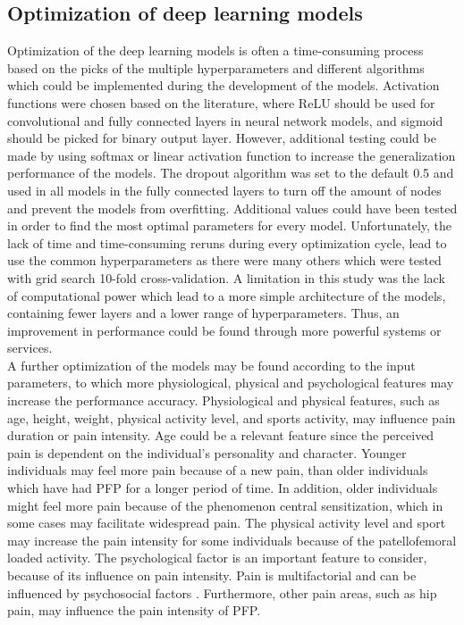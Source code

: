 \subsection{Optimization of deep learning models}
Optimization of the deep learning models is often a time-consuming process based on the picks of the multiple hyperparameters and different algorithms which could be implemented during the development of the models.
Activation functions were chosen based on the literature, where ReLU should be used for convolutional and fully connected layers in neural network models, and sigmoid should be picked for binary output layer. However, additional testing could be made by using softmax or linear activation function to increase the generalization performance of the models. The dropout algorithm was set to the default 0.5 and used in all models in the fully connected layers to turn off the amount of nodes and prevent the models from overfitting. Additional values could have been tested in order to find the most optimal parameters for every model.
Unfortunately, the lack of time and time-consuming reruns during every optimization cycle, lead to use the common hyperparameters as there were many others which were tested with grid search 10-fold cross-validation.
\noindent
A limitation in this study was the lack of computational power which lead to a more simple architecture of the models, containing fewer layers and a lower range of hyperparameters. Thus, an improvement in performance could be found through more powerful systems or services. \\
\noindent
A further optimization of the models may be found according to the input parameters, to which more physiological, physical and psychological features may increase the performance accuracy. Physiological and physical features, such as age, height, weight, physical activity level, and sports activity, may influence pain duration or pain intensity. Age could be a relevant feature since the perceived pain is dependent on the individual's personality and character. Younger individuals may feel more pain because of a new pain, than older individuals which have had PFP for a longer period of time. In addition, older individuals might feel more pain because of the phenomenon central sensitization, which in some cases may facilitate widespread pain. The physical activity level and sport may increase the pain intensity for some individuals because of the patellofemoral loaded activity. The psychological factor is an important feature to consider, because of its influence on pain intensity. Pain is multifactorial and can be influenced by psychosocial factors \citep{Roos2003}. Furthermore, other pain areas, such as hip pain, may influence the pain intensity of PFP.
